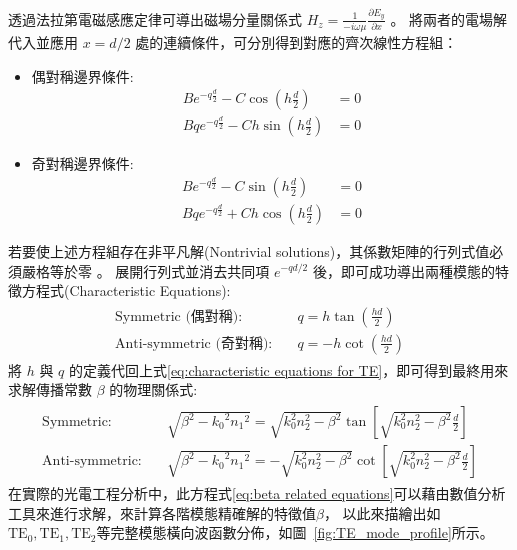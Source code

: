 透過法拉第電磁感應定律可導出磁場分量關係式 $H_{z} = \frac{1}{-i\omega\mu}\frac{\partial E_{y}}{\partial x}$ 。
將兩者的電場解代入並應用 $x = d/2$ 處的連續條件，可分別得到對應的齊次線性方程組：
\begin{itemize}
    \item 偶對稱邊界條件:
    \begin{align}
    B e^{-q\frac{d}{2}} - C \cos\left(h\frac{d}{2}\right) &= 0 \\
    B q e^{-q\frac{d}{2}} - C h \sin\left(h\frac{d}{2}\right) &= 0
    \end{align}
    \item 奇對稱邊界條件:
    \begin{align}
    B e^{-q\frac{d}{2}} - C \sin\left(h\frac{d}{2}\right) &= 0 \\
    B q e^{-q\frac{d}{2}} + C h \cos\left(h\frac{d}{2}\right) &= 0
    \end{align}
\end{itemize}
若要使上述方程組存在非平凡解(Nontrivial solutions)，其係數矩陣的行列式值必須嚴格等於零 。
展開行列式並消去共同項 $e^{-qd/2}$ 後，即可成功導出兩種模態的特徵方程式(Characteristic Equations):
\begin{align}
    \begin{aligned}
    \text{Symmetric (偶對稱):} \quad & q = h \tan\left(\frac{hd}{2}\right) \\
    \text{Anti-symmetric (奇對稱):} \quad & q = -h \cot\left(\frac{hd}{2}\right)
    \label{eq:characteristic equations for TE}
    \end{aligned}
\end{align}
將 $h$ 與 $q$ 的定義代回上式\eqref{eq:characteristic equations for TE}，即可得到最終用來求解傳播常數 $\beta$ 的物理關係式:
\begin{align}
    \begin{aligned}
    \text{Symmetric:} \quad & \sqrt{\beta^{2}-{k_{0}}^{2}{n_{1}}^{2}} = \sqrt{k_{0}^{2}n_{2}^{2}-\beta^{2}} \tan\left[\sqrt{k_{0}^{2}n_{2}^{2}-\beta^{2}}\frac{d}{2}\right] \\
    \text{Anti-symmetric:} \quad & \sqrt{\beta^{2}-{k_{0}}^{2}{n_{1}}^{2}} = -\sqrt{k_{0}^{2}n_{2}^{2}-\beta^{2}} \cot\left[\sqrt{k_{0}^{2}n_{2}^{2}-\beta^{2}}\frac{d}{2}\right]
    \label{eq:beta related equations}
    \end{aligned}
\end{align}
在實際的光電工程分析中，此方程式\eqref{eq:beta related equations}可以藉由數值分析工具來進行求解，來計算各階模態精確解的特徵值$\beta$，
以此來描繪出如$\text{TE}_0, \text{TE}_1, \text{TE}_2$等完整模態橫向波函數分佈，如圖~\ref{fig:TE_mode_profile}所示。

